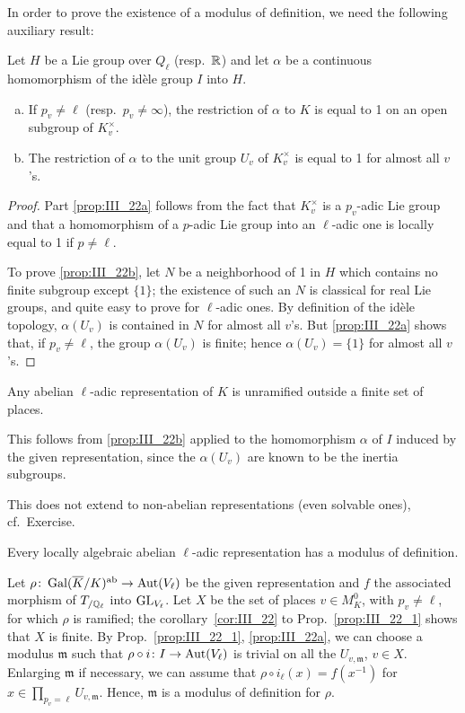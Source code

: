 In order to prove the existence of a modulus of definition, we
need the following auxiliary result:
\begin{prop}\label{prop:III_22_1}
Let $H$ be a Lie group over $Q_\ell$ (resp.\ $\mathbb{R}$) and let
$\alpha$ be a continuous homomorphism of the idèle group $I$ into $H$.
\begin{enumerate}[(a)]
\item\label{prop:III_22a}
	If $p_v \ne \ell$ (resp.\ $p_v \ne \infty$), the restriction of
	$\alpha$ to $K$ is equal to 1 on an open subgroup of $K_v^\times$.
\item\label{prop:III_22b}
	The restriction of $\alpha$ to the unit group $U_v$ of $K_v^\times$ is
	equal to 1 for almost all $v$'s.
\end{enumerate}
\end{prop}
\begin{proof}
	Part \ref{prop:III_22a} follows from the fact that $K_v^\times$ is a
	$p_v$-adic Lie group and that a homomorphism of a $p$-adic Lie group
	into an $\ell$-adic one is locally equal to 1 if $p \ne \ell$.

	To prove \ref{prop:III_22b}, let $N$ be a neighborhood of 1 in $H$
	which contains no finite subgroup except $\{ 1 \}$; the existence of
	such an $N$ is classical for real Lie groups, and quite easy to prove
	for $\ell$-adic ones. By definition of the idèle topology,
	$\alpha(U_v)$ is contained in $N$ for almost all $v$'s. But
	\ref{prop:III_22a} shows that, if $p_v \ne \ell$, the group
	\dpage
	$\alpha(U_v)$ is finite; hence $\alpha(U_v) = \{ 1 \}$ for almost all
	$v$'s.
\end{proof}

\begin{corp}\label{cor:III_22}
	Any abelian $\ell$-adic representation of $K$ is unramified outside a
	finite set of places.
\end{corp}
This follows from \ref{prop:III_22b} applied to the homomorphism $\alpha$ of $I$
induced by the given representation, since the $\alpha(U_v)$ are known to be
the inertia subgroups.

\begin{obs}
This does not extend to non-abelian representations (even solvable ones), cf.\ Exercise.
\end{obs}
\begin{prop}
	Every locally algebraic abelian $\ell$-adic representation has a
	modulus of definition.
\end{prop}
Let $\rho\colon \operatorname{Gal}(\overline{K}/K)^{\mathrm{ab}} \to \operatorname{Aut}(V_\ell)$ be the given
representation and $f$ the associated morphism of $T_{/\mathbb{Q}_\ell}$ into
$\operatorname{GL}_{V_\ell}$. Let $X$ be the set of places $v \in M_K^0$, with $p_v \ne
\ell$, for which $\rho$ is ramified; the corollary~\ref{cor:III_22} to
Prop.~\ref{prop:III_22_1} shows that $X$ is finite. By
Prop.~\ref{prop:III_22_1}, \ref{prop:III_22a}, we can choose a modulus
$\mathfrak{m}$ such that $\rho \circ i\colon I \to \operatorname{Aut}(V_\ell)$ is trivial on
all the $U_{v, \mathfrak{m}}$, $v \in X$. Enlarging $\mathfrak{m}$ if
necessary, we can assume that $\rho \circ i_\ell(x) = f(x^{-1})$ for $x \in
\prod_{p_v = \ell} U_{v, \mathfrak{m}}$. Hence, $\mathfrak{m}$ is a modulus of
definition for $\rho$.

